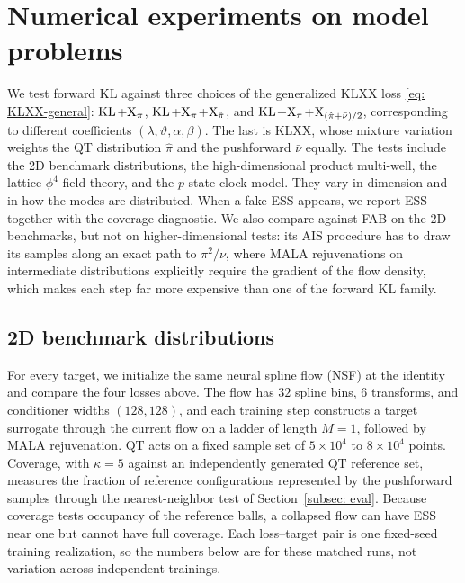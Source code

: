 \documentclass{article}
\begin{document}
\section{Numerical experiments on model problems}
\label{sec: experiments}

We test forward KL against three choices of the generalized KLXX loss \eqref{eq: KLXX-general}: $\mathrm{KL}$+$\mathrm{X}_\pi$, $\mathrm{KL}$+$\mathrm{X}_\pi$+$\mathrm{X}_{\hat\pi}$, and $\mathrm{KL}$+$\mathrm{X}_\pi$+$\mathrm{X}_{(\hat\pi+\bar\nu)/2}$, corresponding to different coefficients $(\lambda,\vartheta,\alpha,\beta)$. The last is KLXX, whose mixture variation weights the QT distribution $\hat\pi$ and the pushforward $\bar\nu$ equally. The tests include the 2D benchmark distributions, the high-dimensional product multi-well, the lattice $\phi^4$ field theory, and the $p$-state clock model. They vary in dimension and in how the modes are distributed. When a fake ESS appears, we report ESS together with the coverage diagnostic. {\color{blue}We also compare against FAB \citep{midgley2022flow} on the 2D benchmarks, but not on higher-dimensional tests: its AIS procedure has to draw its samples along an exact path to $\pi^2/\nu$, where MALA rejuvenations on intermediate distributions explicitly require the gradient of the flow density, which makes each step far more expensive than one of the forward KL family.}

\subsection{2D benchmark distributions}
\label{subsec: 2d-benchmark}

For every target, we initialize the same neural spline flow (NSF) \citep{durkan2019neural} at the identity and compare the four losses above. The flow has $32$ spline bins, $6$ transforms, and conditioner widths $(128,128)$, and each training step constructs a target surrogate through the current flow on a ladder of length $M=1$, followed by MALA rejuvenation. QT acts on a fixed sample set of $5\times10^4$ to $8\times10^4$ points. Coverage, with $\kappa=5$ against an independently generated QT reference set, measures the fraction of reference configurations represented by the pushforward samples through the nearest-neighbor test of Section~\ref{subsec: eval}. Because coverage tests occupancy of the reference balls, a collapsed flow can have ESS near one but cannot have full coverage. Each loss--target pair is one fixed-seed training realization, so the numbers below are for these matched runs, not variation across independent trainings.
\end{document}
